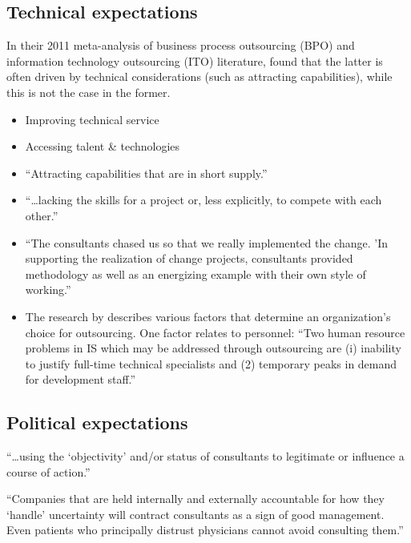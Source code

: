 \documentclass[12pt]{article}
\providecommand{\tightlist}{%
  \setlength{\itemsep}{0pt}\setlength{\parskip}{0pt}}
\begin{document}
\hypertarget{technical-expectations}{%
\subsection{Technical expectations}\label{technical-expectations}}

In their 2011 meta-analysis of business process outsourcing (BPO) and
information technology outsourcing (ITO) literature, \citet{lacity2011}
found that the latter is often driven by technical considerations (such
as attracting capabilities), while this is not the case in the former.

\begin{itemize}
\tightlist
\item
  Improving technical service
\item
  Accessing talent \& technologies
\item
  ``Attracting capabilities that are in short supply.''
  \citet[52]{aubert1996}
\item
  ``\ldots lacking the skills for a project or, less explicitly, to
  compete with each other.'' \citep[ 233]{sturdy1998}
\item
  ``The consultants chased us so that we really implemented the change.
  'In supporting the realization of change projects, consultants
  provided methodology as well as an energizing example with their own
  style of working.'' \citep[ 54]{werr2002}
\item
  The research by \citet{ketler1993} describes various factors that
  determine an organization's choice for outsourcing. One factor relates
  to personnel: ``Two human resource problems in IS which may be
  addressed through outsourcing are (i) inability to justify full-time
  technical specialists and (2) temporary peaks in demand for
  development staff.'' \citet{ketler1993}
\end{itemize}

\hypertarget{political-expectations}{%
\subsection{Political expectations}\label{political-expectations}}

``\ldots using the `objectivity' and/or status of consultants to
legitimate or influence a course of action.'' \citep[ 233]{sturdy1998}

``Companies that are held internally and externally accountable for how
they `handle' uncertainty will contract consultants as a sign of good
management. Even patients who principally distrust physicians cannot
avoid consulting them.'' \citep[70]{kieser2006}
\end{document}
